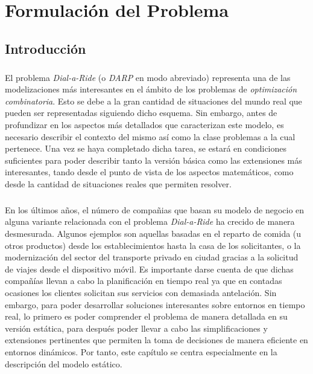 \documentclass{subfiles}
\begin{document}
  \chapter{Formulación del Problema}
  \label{chap:formulation}

    \section{Introducción}
    \label{sec:formulation_introduction}

      \paragraph{}
      El problema \emph{Dial-a-Ride} (o \emph{DARP} en modo abreviado) representa una de las modelizaciones más interesantes en el ámbito de los problemas de \emph{optimización combinatoria}. Esto se debe a la gran cantidad de situaciones del mundo real que pueden ser representadas siguiendo dicho esquema. Sin embargo, antes de profundizar en los aspectos más detallados que caracterizan este modelo, es necesario describir el contexto del mismo así como la clase problemas a la cual pertenece. Una vez se haya completado dicha tarea, se estará en condiciones suficientes para poder describir tanto la versión básica como las extensiones más interesantes, tando desde el punto de vista de los aspectos matemáticos, como desde la cantidad de situaciones reales que permiten resolver.

      \paragraph{}
      En los últimos años, el número de compañias que basan su modelo de negocio en alguna variante relacionada con el problema \emph{Dial-a-Ride} ha crecido de manera desmesurada. Algunos ejemplos son aquellas basadas en el reparto de comida (u otros productos) desde los establecimientos hasta la casa de los solicitantes, o la modernización del sector del transporte privado en ciudad gracias a la solicitud de viajes desde el dispositivo móvil. Es importante darse cuenta de que dichas compañías llevan a cabo la planificación en tiempo real ya que en contadas ocasiones los clientes solicitan sus servicios con demasiada antelación. Sin embargo, para poder desarrollar soluciones interesantes sobre entornos en tiempo real, lo primero es poder comprender el problema de manera detallada en su versión estática, para después poder llevar a cabo las simplificaciones y extensiones pertinentes que permiten la toma de decisiones de manera eficiente en entornos dinámicos. Por tanto, este capítulo se centra especialmente en la descripción del modelo estático. 
\end{document}
